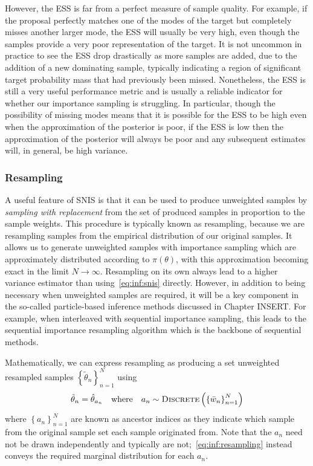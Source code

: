 However, the ESS is far from a perfect measure of sample quality.  For example, if the proposal
perfectly matches one of the modes of the target but completely misses another larger mode, the
ESS will usually be very high, even though the samples provide a very poor representation of the
target.  It is not uncommon in practice to see the ESS drop drastically as more samples are added,
due to the addition of a new dominating sample, typically indicating a region of significant target probability
mass that had previously been missed.  Nonetheless, the ESS is still a very useful performance
metric and is usually a reliable indicator for whether our importance sampling is struggling.  
In particular, though the possibility of missing modes means that it is possible for the ESS to be 
high even when the approximation of the posterior is poor, if the ESS is low then the approximation 
of the posterior will always be poor and any subsequent estimates will, in general, be high variance.

\subsubsection{Resampling}
\label{sec:inf:foundation:resampling}

A useful feature of SNIS is that it can be used to produce unweighted samples
by \emph{sampling with replacement} from the set of produced samples in proportion
to the sample weights.  This procedure is typically known as resampling, because we
are resampling samples from the empirical distribution of our original samples.
It allows us to generate unweighted samples with importance sampling which are
approximately distributed according to $\pi(\theta)$, with this approximation becoming
exact in the limit $N\rightarrow\infty$.  
Resampling on its own always lead to a higher variance estimator than using~\eqref{eq:inf:snis}
directly.   However, in addition to  being necessary when unweighted samples are required,
it will be a key component in the so-called particle-based inference methods discussed
in Chapter INSERT.  For example, when interleaved with sequential importance sampling,
this leads to the sequential importance resampling algorithm which is the backbone of 
sequential \mc methods.

Mathematically, we can express resampling as producing a set unweighted resampled
samples $\left\{\tilde{\theta}_n\right\}_{n=1}^N$ using
\begin{align}
\label{eq:inf:resampling}
\tilde{\theta}_n = \hat{\theta}_{a_n} \quad \mathrm{where} \quad
a_n \sim \textsc{Discrete}\left(\left\{\bar{w}_n\right\}_{n=1}^N\right)
\end{align}
where $\left\{a_n\right\}_{n=1}^N$ are known as ancestor indices as they indicate which sample
from the original sample set each sample originated from.  Note that the $a_n$ need
not be drawn independently and typically are not;~\eqref{eq:inf:resampling} instead conveys
the required marginal distribution for each $a_n$.  

